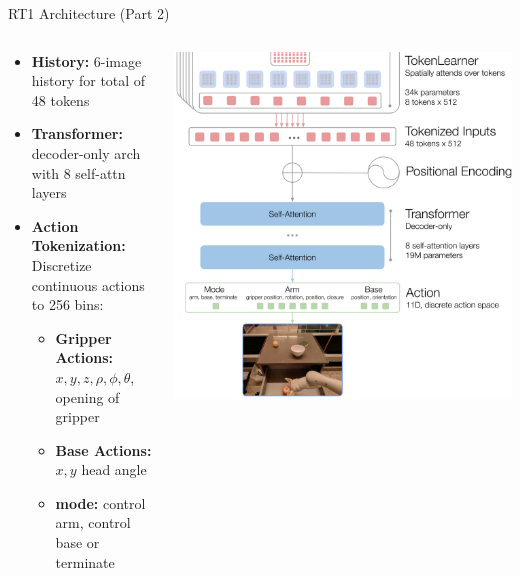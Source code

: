 \documentclass{beamer}
\begin{document}
\begin{frame}[t]{RT1 Architecture (Part 2)}
    \begin{columns}
        \hspace{0.5em}
		\begin{column}{.5\textwidth}
            \begin{itemize}[label=-]
                \item \textbf{History:} 6-image history for total of 48 tokens
                \item \textbf{Transformer:} decoder-only arch with 8 self-attn layers
                \item \textbf{Action Tokenization:} Discretize continuous actions to 256 bins:
                \begin{itemize}[label=-]
                    \item \textbf{Gripper Actions:} $x,y,z,\rho,\phi,\theta$, opening of gripper
                    \item \textbf{Base Actions:} $x,y$ head angle
                    \item \textbf{mode:} control arm, control base or terminate
                \end{itemize}
            \end{itemize}
		\end{column}
        \hspace{0em}
		\begin{column}{.5\textwidth}
            \begin{center}
                \includegraphics[width=1.0\textwidth]{./img/rt1_arch_2.png}
            \end{center}
		\end{column}
        \hspace{0.25em}
	\end{columns}
\end{frame}
\end{document}
